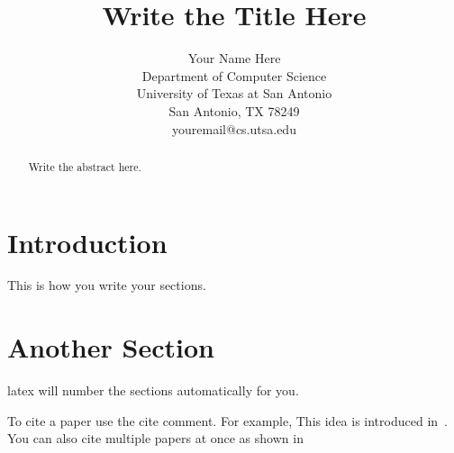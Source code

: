 \documentclass[11pt]{article}
\begin{document}
\title{Write the Title Here}

\author{Your Name Here\\
        Department of Computer Science\\
        University of Texas at San Antonio\\
        San Antonio, TX 78249\\
        youremail@cs.utsa.edu}

\date{ }
\maketitle 

\begin{abstract}
Write the abstract here.
\end{abstract}

\section{Introduction}
This is how you write your sections.

\section{Another Section}
latex will number the sections automatically for you.

To cite a paper use the cite comment. For example, This
idea is introduced in~\cite{tosuncikm2002}. You can also
cite multiple papers at once as shown 
in~\cite{tosunicme2000,tosuncikm2002,tosunitcc2001,tosunMM01}



\end{document}
